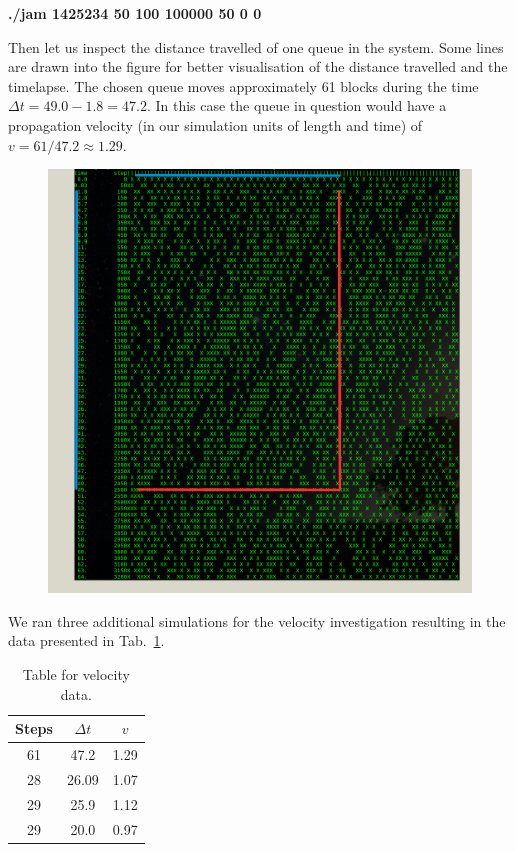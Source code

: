 \documentclass[a4paper,12pt]{article}
\begin{document}
\begin{enumerate}
{\bf{./jam 1425234 50 100 100000 50 0 0}} 

Then let us inspect the distance travelled of one queue in the system. Some lines are drawn into the figure for better visualisation of the distance travelled and the timelapse. The chosen queue moves approximately 61 blocks during the time $\Delta t = 49.0 - 1.8 = 47.2 $. In this case the queue in question would have a propagation velocity (in our simulation units of length and time) of $ v = 61/47.2 \approx 1.29 $.

\begin{figure}[h]
\centering
\includegraphics[width=\columnwidth]{vel.png}
\caption{}
\label{pic:vel}
\end{figure}

We ran three additional simulations for the velocity investigation resulting in the data presented in Tab.~\ref{tab:vel}.

\begin{table}[h!]
\centering
\begin{tabular}{|c|c|c|}
\hline
Steps & $\Delta t$ & $v$ \\ \hline
61 & 47.2 & 1.29 \\ \hline
28 & 26.09 & 1.07 \\ \hline
29 & 25.9 & 1.12 \\ \hline
29 & 20.0 & 0.97 \\ \hline
\end{tabular}
\caption{Table for velocity data.}
\label{tab:vel}
\end{table}


\end{enumerate}
\end{document}
